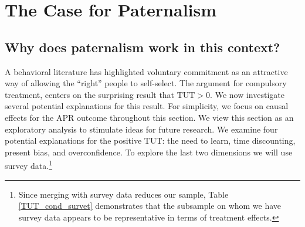 \documentclass[11pt, a4paper]{article}
\begin{document}
\section{The Case for Paternalism}
\label{Paternalism}

\subsection{Why does paternalism work in this context?}
\label{why_paternalism}

A behavioral literature has highlighted voluntary commitment as an attractive way of allowing the ``right'' people to self-select. %
The argument for compulsory treatment, centers on the surprising result that $\text{TUT}>0$. We now investigate several potential explanations for this result.
For simplicity, we focus on causal effects for the APR outcome throughout this section. We view this section as an exploratory analysis to stimulate ideas for future research. We examine four potential explanations for the positive $\text{TUT}$: the need to learn, time discounting, present bias, and overconfidence.  To explore the last two dimensions we will use survey data.\footnote{Since merging with survey data reduces our sample, Table \ref{TUT_cond_survet} demonstrates that the subsample on whom we have survey data appears to be representative in terms of treatment effects.}  
   
\end{document}
